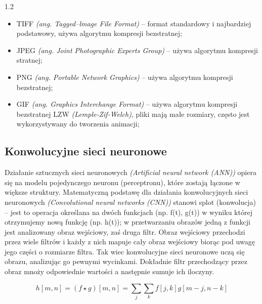 \documentclass[a4paper,12pt]{article}
\newcommand\spacingInSolemnItemize{1.2}
\newcommand\spacingIndent{2.2em}
\begin{document}
				\begin{spacing}{\spacingInSolemnItemize}
					\begin{itemize}
						\item TIFF \textit{(ang. Tagged--lmage File Format)} -- format standardowy i najbardziej podstawowy, używa algorytmu kompresji bezstratnej;
						\item JPEG \textit{(ang. Joint Photographic Experts Group)} -- używa algorytmu kompresji stratnej;
						\item PNG \textit{(ang. Portable Network Graphics)} -- używa algorytmu kompresji bezstratnej; 
						\item GIF \textit{(ang. Graphics Interchange Format)} -- używa algorytmu kompresji bezstratnej LZW \textit{(Lemple-Zif-Welch)}, 
							pliki mają małe rozmiary, często jest wykorzystywany do tworzenia animacji;
					\end{itemize}
				\end{spacing}
    
    \subsection{Konwolucyjne sieci neuronowe}
        \hspace{\spacingIndent} Działanie sztucznych sieci neuronowych \textit{(Artificial neural network (ANN))} opiera się na modelu pojedynczego     
			neuronu (perceptronu), które zostają łączone w większe struktury. Matematyczną podstawę dla działania konwolucyjnych sieci neuronowych 
			\textit{(Convolutional neural networks (CNN))} stanowi splot (konwolucja) -- jest to operacja określana na dwóch funkcjach (np. f(t), g(t)) 
			w wyniku której otrzymujemy nową funkcję (np. h(t)); w przetwarzaniu obrazów jedną z funkcji jest analizowany obraz wejściowy, zaś druga filtr.
            Obraz wejściowy przechodzi przez wiele filtrów i każdy z nich mapuje cały obraz wejściowy biorąc pod uwagę jego części o rozmiarze filtra. 
			Tak wiec konwolucyjne sieci neuronowe uczą się obrazu, analizując go pewnymi wycinkami. Dokładnie filtr przechodzący przez obraz 
			mnoży odpowiednie wartości a następnie sumuje ich iloczyny.
			
			
        
            \begin{displaymath}
                h[m, n] = ( f \star g)[m, n] = \sum\limits_{j}\sum\limits_{k}f[j, k]g[m-j, n-k]
            \end{displaymath}
            
\end{document}
